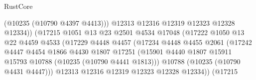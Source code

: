\begin{lexlean}{RustCore}
\begin{coremodule}
                                            (@10235 (@10790 @4397 @4413)))
                                          @12313
                                          @12316
                                          @12319
                                          @12323
                                          @12328
                                          @12334))
                                      (@17215
                                        @1051
                                        @13
                                        @23
                                        @2501
                                        @4534
                                        @17048
                                        (@17222
                                          @1050
                                          @13
                                          @22
                                          @4459
                                          @4533
                                          (@17229
                                            @4448
                                            @4457
                                            (@17234
                                              @4448
                                              @4455
                                              @2061
                                              (@17242
                                                @4447
                                                @4454
                                                @1866
                                                @4430
                                                @1807
                                                @17251
                                                (@15901
                                                  @4440
                                                  @1807
                                                  @15911
                                                  @15793
                                                  @10788
                                                  (@10235 (@10790 @4441 @1813)))
                                                @10788
                                                (@10235 (@10790 @4431 @4447)))
                                              @12313
                                              @12316
                                              @12319
                                              @12323
                                              @12328
                                              @12334))
                                          (@17215

\end{coremodule}
\end{lexlean}
